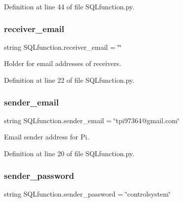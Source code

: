 Definition at line 44 of file S\+Q\+Lfunction.\+py.

\mbox{\label{namespace_s_q_lfunction_a51ebdaf9d64f52b2c266a49020cf12a5}} 
\subsubsection{\texorpdfstring{receiver\+\_\+email}{receiver\_email}}
{\footnotesize\ttfamily string S\+Q\+Lfunction.\+receiver\+\_\+email = \char`\"{}\char`\"{}}



Holder for email addresses of receivers. 



Definition at line 22 of file S\+Q\+Lfunction.\+py.

\mbox{\label{namespace_s_q_lfunction_ac63d06248a3e41c104ae1290bb403c78}} 
\subsubsection{\texorpdfstring{sender\+\_\+email}{sender\_email}}
{\footnotesize\ttfamily string S\+Q\+Lfunction.\+sender\+\_\+email = \char`\"{}tpi97364@gmail.\+com\char`\"{}}



Email sender address for Pi. 



Definition at line 20 of file S\+Q\+Lfunction.\+py.

\mbox{\label{namespace_s_q_lfunction_a0d308a95029254ed328ba365861abdf2}} 
\subsubsection{\texorpdfstring{sender\+\_\+password}{sender\_password}}
{\footnotesize\ttfamily string S\+Q\+Lfunction.\+sender\+\_\+password = \char`\"{}controlsystem\char`\"{}}



